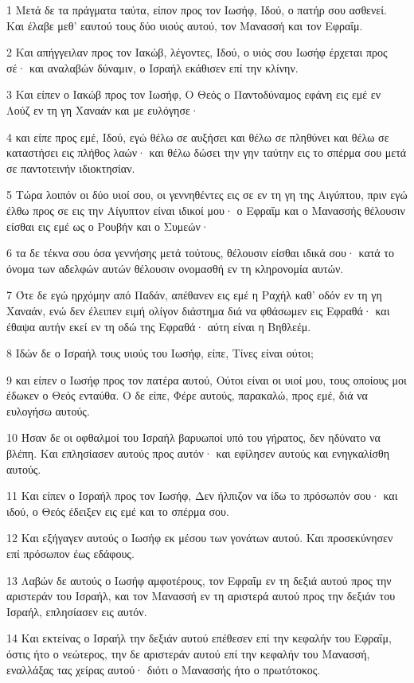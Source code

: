 \par 1 Μετά δε τα πράγματα ταύτα, είπον προς τον Ιωσήφ, Ιδού, ο πατήρ σου ασθενεί. Και έλαβε μεθ' εαυτού τους δύο υιούς αυτού, τον Μανασσή και τον Εφραΐμ.
\par 2 Και απήγγειλαν προς τον Ιακώβ, λέγοντες, Ιδού, ο υιός σου Ιωσήφ έρχεται προς σέ· και αναλαβών δύναμιν, ο Ισραήλ εκάθισεν επί την κλίνην.
\par 3 Και είπεν ο Ιακώβ προς τον Ιωσήφ, Ο Θεός ο Παντοδύναμος εφάνη εις εμέ εν Λούζ εν τη γη Χαναάν και με ευλόγησε·
\par 4 και είπε προς εμέ, Ιδού, εγώ θέλω σε αυξήσει και θέλω σε πληθύνει και θέλω σε καταστήσει εις πλήθος λαών· και θέλω δώσει την γην ταύτην εις το σπέρμα σου μετά σε παντοτεινήν ιδιοκτησίαν.
\par 5 Τώρα λοιπόν οι δύο υιοί σου, οι γεννηθέντες εις σε εν τη γη της Αιγύπτου, πριν εγώ έλθω προς σε εις την Αίγυπτον είναι ιδικοί μου· ο Εφραΐμ και ο Μανασσής θέλουσιν είσθαι εις εμέ ως ο Ρουβήν και ο Συμεών·
\par 6 τα δε τέκνα σου όσα γεννήσης μετά τούτους, θέλουσιν είσθαι ιδικά σου· κατά το όνομα των αδελφών αυτών θέλουσιν ονομασθή εν τη κληρονομία αυτών.
\par 7 Ότε δε εγώ ηρχόμην από Παδάν, απέθανεν εις εμέ η Ραχήλ καθ' οδόν εν τη γη Χαναάν, ενώ δεν έλειπεν ειμή ολίγον διάστημα διά να φθάσωμεν εις Εφραθά· και έθαψα αυτήν εκεί εν τη οδώ της Εφραθά· αύτη είναι η Βηθλεέμ.
\par 8 Ιδών δε ο Ισραήλ τους υιούς του Ιωσήφ, είπε, Τίνες είναι ούτοι;
\par 9 και είπεν ο Ιωσήφ προς τον πατέρα αυτού, Ούτοι είναι οι υιοί μου, τους οποίους μοι έδωκεν ο Θεός ενταύθα. Ο δε είπε, Φέρε αυτούς, παρακαλώ, προς εμέ, διά να ευλογήσω αυτούς.
\par 10 Ήσαν δε οι οφθαλμοί του Ισραήλ βαρυωποί υπό του γήρατος, δεν ηδύνατο να βλέπη. Και επλησίασεν αυτούς προς αυτόν· και εφίλησεν αυτούς και ενηγκαλίσθη αυτούς.
\par 11 Και είπεν ο Ισραήλ προς τον Ιωσήφ, Δεν ήλπιζον να ίδω το πρόσωπόν σου· και ιδού, ο Θεός έδειξεν εις εμέ και το σπέρμα σου.
\par 12 Και εξήγαγεν αυτούς ο Ιωσήφ εκ μέσου των γονάτων αυτού. Και προσεκύνησεν επί πρόσωπον έως εδάφους.
\par 13 Λαβών δε αυτούς ο Ιωσήφ αμφοτέρους, τον Εφραΐμ εν τη δεξιά αυτού προς την αριστεράν του Ισραήλ, και τον Μανασσή εν τη αριστερά αυτού προς την δεξιάν του Ισραήλ, επλησίασεν εις αυτόν.
\par 14 Και εκτείνας ο Ισραήλ την δεξιάν αυτού επέθεσεν επί την κεφαλήν του Εφραΐμ, όστις ήτο ο νεώτερος, την δε αριστεράν αυτού επί την κεφαλήν του Μανασσή, εναλλάξας τας χείρας αυτού· διότι ο Μανασσής ήτο ο πρωτότοκος.
